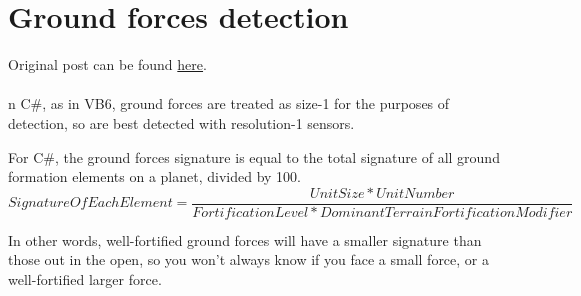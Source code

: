 \documentclass[../../Aurora C# unofficial manual.tex]{subfiles}
\begin{document}
	\section{Ground forces detection}
	Original post can be found
	\href{http://aurora2.pentarch.org/index.php?topic=8495.msg110371#msg110371}{here}.
	\\\\
	
	n C\#, as in VB6, ground forces are treated as size-1 for the purposes of detection, so are best detected with resolution-1 sensors.
	
	For C\#, the ground forces signature is equal to the total signature of all ground formation elements on a planet, divided by 100.
	\[ Signature Of Each Element = \frac{Unit Size * Unit Number}{Fortification Level * Dominant Terrain Fortification Modifier} \]
	
	In other words, well-fortified ground forces will have a smaller signature than those out in the open, so you won't always know if you face a small force, or a well-fortified larger force.
\end{document}
